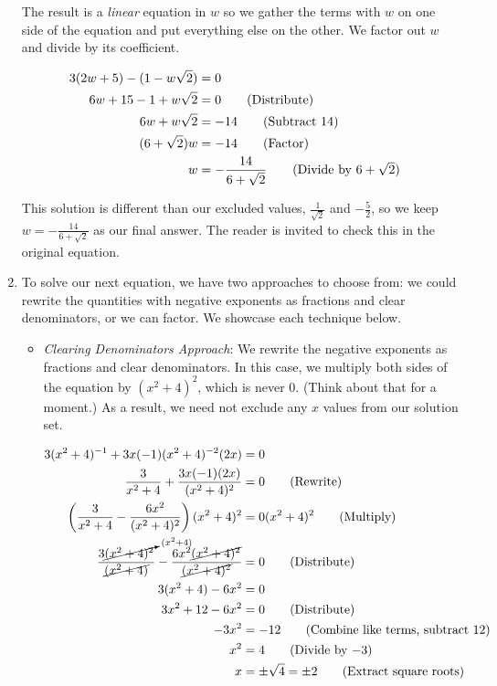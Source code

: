 \begin{ex}
\begin{enumerate}
The result is a \textit{linear} equation in $w$ so we gather the terms with $w$ on one side of the equation and put everything else on the other.  We factor out $w$ and divide by its coefficient.

\begin{align*}
3(2w+5) - (1-w\sqrt{2}) & = 0 & \\
6w + 15 - 1 + w\sqrt{2} & = 0 \tag{Distribute} \\
6w + w\sqrt{2} & = -14 \tag{Subtract $14$} \\
(6 + \sqrt{2})w & = -14 \tag{Factor} \\
w & = -\dfrac{14}{6 + \sqrt{2}} \tag{Divide by $6 + \sqrt{2}$} \\ 
\end{align*}

This solution is different than our excluded values, $\frac{1}{\sqrt{2}}$ and $-\frac{5}{2}$, so we keep $w = -\frac{14}{6 + \sqrt{2}}$ as our final answer.  The reader is invited to check this in the original equation.

\item  To solve our next equation, we have two approaches to choose from:  we could rewrite the quantities with negative exponents as fractions and clear denominators, or we can factor.  We showcase each technique below.

\begin{itemize}

\item \textit{Clearing Denominators Approach}:  We rewrite the negative exponents as fractions and clear denominators.  In this case, we multiply both sides of the equation by $(x^2+4)^2$, which is never $0$. (Think about that for a moment.)  As a result, we need not exclude any $x$ values from our solution set.

\begin{align*}
3(x^2+4)^{-1} + 3x(-1)(x^2+4)^{-2}(2x)& =  0 & \\ 
\dfrac{3}{x^2+4} + \dfrac{3x(-1)(2x)}{(x^2+4)^2} & = 0 \tag{Rewrite} \\ 
\left(\dfrac{3}{x^2+4} - \dfrac{6x^2}{(x^2+4)^2} \right)(x^2+4)^2 & = 0 (x^2+4)^2 \tag{Multiply} \\
\dfrac{3\cancelto{(x^2+4)}{(x^2 + 4)^2}}{\cancel{(x^2+4)}}  - \dfrac{6x^2\cancel{(x^2+4)^2}}{\cancel{(x^2+4)^2}} & = 0 \tag{Distribute} \\ 
3(x^2+4) - 6x^2 & = 0 & \\ 
3x^2 + 12 - 6x^2 & = 0 \tag{Distribute} \\ 
-3x^2 & = -12 \tag{Combine like terms, subtract $12$} \\ 
x^2 & = 4 \tag{Divide by $-3$} \\ 
x & = \pm \sqrt{4} = \pm 2 \tag{Extract square roots} \\ 
\end{align*}


\end{itemize}
\end{enumerate}
\end{ex}
